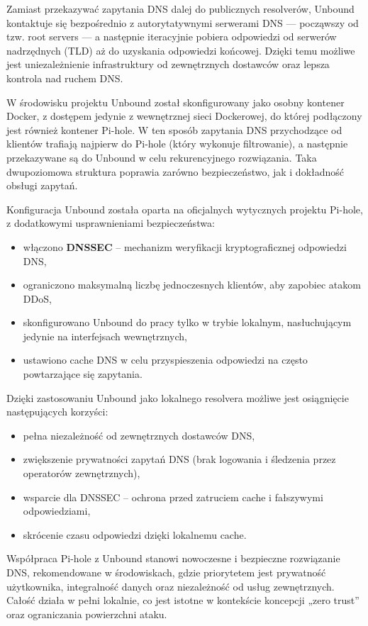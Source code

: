 \documentclass[
    left=2.5cm,         %
    right=2.5cm,        %
    top=2.5cm,          %
    bottom=3cm,         %
    bindingoffset=6mm,  %
    nohyphenation=true %
]{eiti/eiti-thesis} %
\begin{document}
Zamiast przekazywać zapytania DNS dalej do publicznych resolverów, Unbound kontaktuje się bezpośrednio z autorytatywnymi serwerami DNS — począwszy od tzw. root servers — a następnie iteracyjnie pobiera odpowiedzi od serwerów nadrzędnych (TLD) aż do uzyskania odpowiedzi końcowej. Dzięki temu możliwe jest uniezależnienie infrastruktury od zewnętrznych dostawców oraz lepsza kontrola nad ruchem DNS.

W środowisku projektu Unbound został skonfigurowany jako osobny kontener Docker, z dostępem jedynie z wewnętrznej sieci Dockerowej, do której podłączony jest również kontener Pi-hole. W ten sposób zapytania DNS przychodzące od klientów trafiają najpierw do Pi-hole (który wykonuje filtrowanie), a następnie przekazywane są do Unbound w celu rekurencyjnego rozwiązania. Taka dwupoziomowa struktura poprawia zarówno bezpieczeństwo, jak i dokładność obsługi zapytań.

Konfiguracja Unbound została oparta na oficjalnych wytycznych projektu Pi-hole, z dodatkowymi usprawnieniami bezpieczeństwa:
\begin{itemize}
    \item włączono \textbf{DNSSEC} – mechanizm weryfikacji kryptograficznej odpowiedzi DNS,
    \item ograniczono maksymalną liczbę jednoczesnych klientów, aby zapobiec atakom DDoS,
    \item skonfigurowano Unbound do pracy tylko w trybie lokalnym, nasłuchującym jedynie na interfejsach wewnętrznych,
    \item ustawiono cache DNS w celu przyspieszenia odpowiedzi na często powtarzające się zapytania.
\end{itemize}

Dzięki zastosowaniu Unbound jako lokalnego resolvera możliwe jest osiągnięcie następujących korzyści:
\begin{itemize}
    \item pełna niezależność od zewnętrznych dostawców DNS,
    \item zwiększenie prywatności zapytań DNS (brak logowania i śledzenia przez operatorów zewnętrznych),
    \item wsparcie dla DNSSEC – ochrona przed zatruciem cache i fałszywymi odpowiedziami,
    \item skrócenie czasu odpowiedzi dzięki lokalnemu cache.
\end{itemize}

Współpraca Pi-hole z Unbound stanowi nowoczesne i bezpieczne rozwiązanie DNS, rekomendowane w środowiskach, gdzie priorytetem jest prywatność użytkownika, integralność danych oraz niezależność od usług zewnętrznych. Całość działa w pełni lokalnie, co jest istotne w kontekście koncepcji „zero trust” oraz ograniczania powierzchni ataku.
\end{document}
